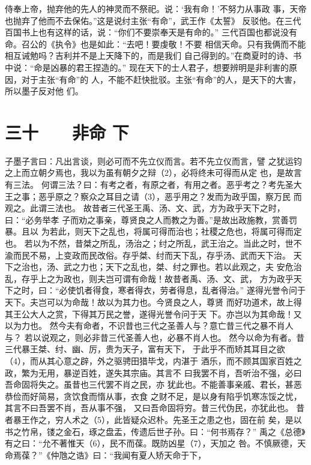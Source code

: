 \documentclass[12pt,UTF8]{ctexbook}
\begin{document}
侍奉上帝，抛弃他的先人的神灵而不祭祀。说：‘我有命！’不努力从事政 
事，天帝也抛弃了他而不去保佑。”这是说纣主张“有命”，武王作《太誓》 
反驳他。在三代百国书上也有这样的话，说：“你们不要崇奉天是有命的。” 
三代百国也都说没有命。召公的《执令》也是如此：“去吧！要虔敬！不要 
相信天命。只有我俩而不能相互诫勉吗？吉利并不是上天降下的，而是我们 
自己得到的。”在商夏时的诗、书中说：“命是凶暴的君王捏造的。” 
现在天下的士人君子，想要辨明是非利害的原因，对于主张“有命”的 
人，不能不赶快批驳。主张“有命”的人，是天下的大害，所以墨子反对他 
们。 

\chapter{三十　　非命 下}

子墨子言曰：凡出言谈，则必可而不先立仪而言。若不先立仪而言，譬 
之犹运钧之上而立朝夕焉也，我以为虽有朝夕之辩（2），必将终未可得而从定 
也，是故言有三法。 
何谓三法？曰：有考之者，有原之者，有用之者。恶乎考之？考先圣大 
王之事；恶乎原之？察众之耳目之请（3），恶乎用之？发而为政乎国，察万民 
而观之。此谓三法也。 
故昔者三代圣王禹、汤、文、武，方为政乎天下之时，曰：“必务举孝 
子而劝之事亲，尊贤良之人而教之为善。”是故出政施教，赏善罚暴。且以 
为若此，则天下之乱也，将属可得而治也；社稷之危也，将属可得而定也。 
若以为不然，昔桀之所乱，汤治之；纣之所乱，武王治之。当此之时，世不 
渝而民不易，上变政而民改俗。存乎桀、纣而天下乱，存乎汤、武而天下治。 
天下之治也，汤、武之力也；天下之乱也，桀、纣之罪也。若以此观之，夫 
安危治乱，存乎上之为政也，则夫岂可谓有命哉！故昔者禹、汤、文、武， 
方为政乎天下之时，曰：“必使饥者得食，寒者得衣，劳者得息，乱者得治。” 
遂得光誉令问于天下。夫岂可以为命哉！故以为其力也。今贤良之人，尊贤 
而好功道术，故上得其王公大人之赏，下得其万民之誉，遂得光誉令问于天 
下。亦岂以为其命哉！又以为力也。 
然今夫有命者，不识昔也三代之圣善人与？意亡昔三代之暴不肖人与？ 
若以说观之，则必非昔三代圣善人也，必暴不肖人也。 
然今以命为有者。昔三代暴王桀、纣、幽、厉，贵为天子，富有天下， 
于此乎不而矫其耳目之欲（4），而从其心意之辟，外之驱骋田猎毕戈，内湛于 
酒乐，而不顾其国家百姓之政，繁为无用，暴逆百姓，遂失其宗庙。其言不 
曰我罢不肖，吾听治不强，必曰吾命固将失之。虽昔也三代罢不肖之民，亦 
犹此也。不能善事亲戚、君长，甚恶恭俭而好简易，贪饮食而惰从事，衣食 
之财不足，是以身有陷乎饥寒冻馁之忧，其言不曰吾罢不肖，吾从事不强， 
又曰吾命固将穷。昔三代伪民，亦犹此也。 
昔者暴王作之，穷人术之（5），此皆疑众迟朴。先圣王之患之也，固在前 
矣，是以书之竹帛，镂之金石，琢之盘盂，传遗后世子孙。曰：“何书焉存？” 
禹之《总德》有之曰：“允不著惟天（6），民不而葆。既防凶星（7），天加之 
咎。不慎厥德，天命焉葆？”《仲虺之诰》曰：“我闻有夏人矫天命于下， 
\end{document}
